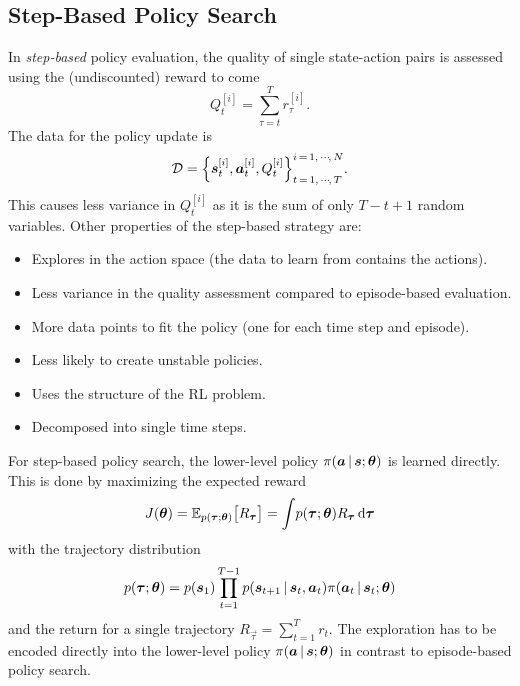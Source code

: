 		\subsection{Step-Based Policy Search}
			In \emph{step-based} policy evaluation, the quality of single state-action pairs is assessed using the (undiscounted) reward to come
			\begin{equation}
				Q_t^{[i]} = \sum_{\tau = t}^{T} r_\tau^{[i]}.  \label{eq:policyGradientRewardToCome}
			\end{equation}
			The data for the policy update is
			\begin{equation*}
				\mathcal{D} = \Big\{ \bm{s}_t^{[i]}, \bm{a}_t^{[i]}, Q_t^{[i]} \Big\}_{t \,=\, 1,\,\cdots\!,\,T}^{i \,=\, 1,\,\cdots\!,\,N}.
			\end{equation*}
			This causes less variance in \( Q_t^{[i]} \) as it is the sum of only \( T - t + 1 \) random variables. Other properties of the step-based strategy are:
			\begin{itemize}
				\item Explores in the action space (the data to learn from contains the actions).
				\item Less variance in the quality assessment compared to episode-based evaluation.
				\item More data points to fit the policy (one for each time step and episode).
				\item Less likely to create unstable policies.
				\item Uses the structure of the RL problem.
				\item Decomposed into single time steps.
			\end{itemize}

			For step-based policy search, the lower-level policy \( \pi(\bm{a} \,\vert\, \bm{s}; \bm{\theta}) \) is learned directly. This is done by maximizing the expected reward
			\begin{equation}
				J(\bm{\theta})
				= \mathbb{E}_{p(\bm{\tau}; \bm{\theta})}\big[ R_{\bm{\tau}} \big]
				= \int\! p(\bm{\tau}; \bm{\theta}) R_{\bm{\tau}} \dd{\bm{\tau}}  \label{eq:policyGradientStepBasedObjective}
			\end{equation}
			with the trajectory distribution
			\begin{equation}
				p(\bm{\tau}; \bm{\theta}) = p(\bm{s}_1) \prod_{t = 1}^{T - 1} p(\bm{s}_{t + 1} \,\vert\, \bm{s}_t, \bm{a}_t) \pi(\bm{a}_t \,\vert\, \bm{s}_t; \bm{\theta})  \label{eq:policyGradientTrajectoryDistribution}
			\end{equation}
			and the return for a single trajectory \( R_{\vec{\tau}} = \sum_{t = 1}^{T} r_t \). The exploration has to be encoded directly into the lower-level policy \( \pi(\bm{a} \,\vert\, \bm{s}; \bm{\theta}) \) in contrast to episode-based policy search.

